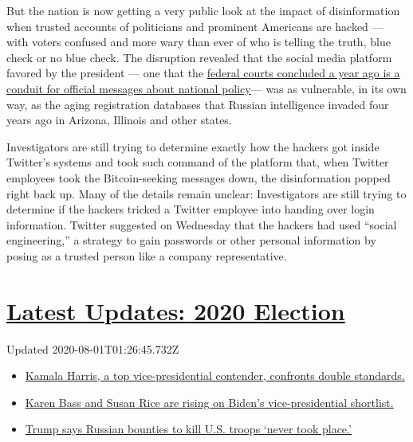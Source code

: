 But the nation is now getting a very public look at the impact of
disinformation when trusted accounts of politicians and prominent
Americans are hacked --- with voters confused and more wary than ever of
who is telling the truth, blue check or no blue check. The disruption
revealed that the social media platform favored by the president --- one
that the
\href{https://www.nytimes.com/2019/07/09/us/politics/trump-twitter-first-amendment.html}{federal
courts concluded a year ago is a conduit for official messages about
national policy}--- was as vulnerable, in its own way, as the aging
registration databases that Russian intelligence invaded four years ago
in Arizona, Illinois and other states.

Investigators are still trying to determine exactly how the hackers got
inside Twitter's systems and took such command of the platform that,
when Twitter employees took the Bitcoin-seeking messages down, the
disinformation popped right back up. Many of the details remain unclear:
Investigators are still trying to determine if the hackers tricked a
Twitter employee into handing over login information. Twitter suggested
on Wednesday that the hackers had used ``social engineering,'' a
strategy to gain passwords or other personal information by posing as a
trusted person like a company representative.

\hypertarget{latest-updates-2020-election}{%
\section{\texorpdfstring{\href{https://www.nytimes.com/2020/07/31/us/elections/biden-vs-trump.html?action=click\&pgtype=Article\&state=default\&region=MAIN_CONTENT_1\&context=storylines_live_updates}{Latest
Updates: 2020
Election}}{Latest Updates: 2020 Election}}\label{latest-updates-2020-election}}

Updated 2020-08-01T01:26:45.732Z

\begin{itemize}
\tightlist
\item
  \href{https://www.nytimes.com/2020/07/31/us/elections/biden-vs-trump.html?action=click\&pgtype=Article\&state=default\&region=MAIN_CONTENT_1\&context=storylines_live_updates\#link-29fdff45}{Kamala
  Harris, a top vice-presidential contender, confronts double
  standards.}
\item
  \href{https://www.nytimes.com/2020/07/31/us/elections/biden-vs-trump.html?action=click\&pgtype=Article\&state=default\&region=MAIN_CONTENT_1\&context=storylines_live_updates\#link-13ec3d9c}{Karen
  Bass and Susan Rice are rising on Biden's vice-presidential
  shortlist.}
\item
  \href{https://www.nytimes.com/2020/07/31/us/elections/biden-vs-trump.html?action=click\&pgtype=Article\&state=default\&region=MAIN_CONTENT_1\&context=storylines_live_updates\#link-49e9a016}{Trump
  says Russian bounties to kill U.S. troops `never took place.'}
\end{itemize}

